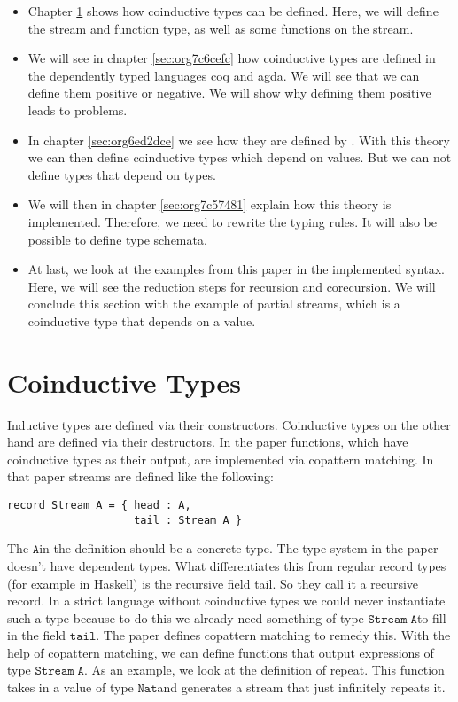 \documentclass[a4paper,cleardoubleempty,BCOR1cm]{scrbook}
\begin{document}
\begin{itemize}
\item Chapter \ref{sec:orgc231b78} shows how coinductive types can be defined.
Here, we will define the stream and function type, as well as some
functions on the stream.

\item We will see in chapter \ref{sec:org7c6cefc} how
coinductive types are defined in the dependently typed languages coq and agda.
We will see that we can define them positive or negative. We will show why
defining them positive leads to problems.

\item In chapter \ref{sec:org6ed2dce} we
see how they are defined by \cite{basold2016type}. With this theory we can then
define coinductive types which depend on values.  But we can not define types
that depend on types.

\item We will then in chapter \ref{sec:org7c57481} explain how this theory is
implemented. Therefore, we need to rewrite the typing rules. It will also be
possible to define type schemata.

\item At last, we look at the examples from this paper \cite{basold2016type} in the implemented syntax.
Here, we will see the reduction steps for recursion and corecursion. We will
conclude this section with the example of partial streams, which is a
coinductive type that depends on a value.
\end{itemize}

\chapter{Coinductive Types}
\label{sec:orgc231b78}
Inductive types are defined via their constructors.  Coinductive types on
the other hand are defined via their destructors.  In the paper \cite{abel2013copatterns}
functions, which have coinductive types as their output, are implemented via
copattern matching.  In that paper streams are defined like the following:

\begin{lstlisting}
record Stream A = { head : A,
                    tail : Stream A }
\end{lstlisting}

The $\mathtt{A}$\;in the definition should be a concrete type. The type system in the
paper doesn't have dependent types. What differentiates this from regular record
types (for example in Haskell) is the recursive field tail. So they call it a
recursive record. In a strict language without coinductive types we could never
instantiate such a type because to do this we already need something of type
$\mathtt{Stream\;A}$\;to fill in the field $\mathtt{tail}$. The paper defines
copattern matching to remedy this. With the help of copattern matching, we can define functions
that output expressions of type $\mathtt{Stream\;A}$. As an example, we look at the
definition of repeat. This function takes in a value of type $\mathtt{Nat}$\;and
generates a stream that just infinitely repeats it.
\end{document}
